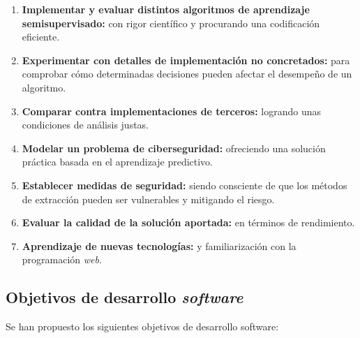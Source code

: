 \begin{enumerate}
	\item \textbf{Implementar y evaluar distintos algoritmos de aprendizaje semisupervisado:} con rigor científico y procurando una codificación eficiente.
	\item \textbf{Experimentar con detalles de implementación no concretados:} para comprobar cómo determinadas decisiones pueden afectar el desempeño de un algoritmo.
	\item \textbf{Comparar contra implementaciones de terceros:} logrando unas condiciones de análisis justas.
	\item \textbf{Modelar un problema de ciberseguridad:} ofreciendo una solución práctica basada en el aprendizaje predictivo.
	\item \textbf{Establecer medidas de seguridad:} siendo consciente de que los métodos de extracción pueden ser vulnerables y mitigando el riesgo.
	\item \textbf{Evaluar la calidad de la solución aportada:} en términos de rendimiento.
	\item \textbf{Aprendizaje de nuevas tecnologías:} y familiarización con la programación \textit{web}.
	
\end{enumerate}

\subsection{Objetivos de desarrollo \textit{software}}
\label{Objetivos de desarrollo}

Se han propuesto los siguientes objetivos de desarrollo software:

